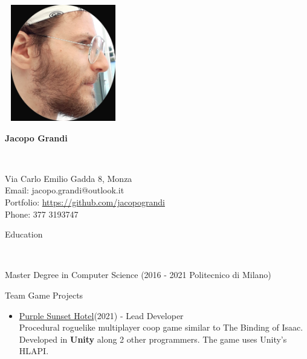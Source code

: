 \documentclass[10pt]{article}
\begin{document}
\setlength{\parindent}{0in}
\thispagestyle{empty} 
{\selectfont


\begin{multicols}{2}

	\includegraphics[height=2in, width=2in]{me_pirate}
	\vfill

	\begin{flushright}
		\begin{Huge}\textbf{Jacopo Grandi} \end{Huge} \\
		\vfill

		Via Carlo Emilio Gadda 8, Monza \\
		Email: jacopo.grandi@outlook.it \\
		\textcolor{coolred} { Portfolio: \url{https://github.com/jacopograndi}} \\
		Phone: 377 3193747 \\
	\end{flushright}
\end{multicols}

\vspace{0.3in}

\begin{Large} \textcolor{coolorange} { Education } \end{Large} \\

\medskip

Master Degree in Computer Science (2016 - 2021 Politecnico di Milano) \\

\vspace{0.25in}


\begin{Large} \textcolor{coolorange} { Team Game Projects } \end{Large}
\begin{itemize}
\item \textcolor{coolred} { \href{https://github.com/soulsofarmony/PurpleSunsetHotel} {Purple Sunset Hotel}}(2021) - Lead Developer \\
	Procedural roguelike multiplayer coop game similar to The Binding of Isaac.
		Developed in \textbf{Unity} along 2 other programmers. The game uses Unity's HLAPI.


\end{itemize}}
\end{document}
